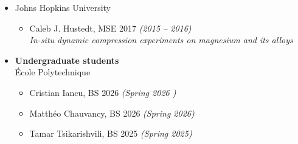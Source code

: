 \documentclass[a4paper,10pt, oneside]{article}
\begin{document}
\begin{itemize}[wide, labelwidth=!, labelindent=-1em]
\begin{itemize}[wide, labelwidth=!, labelindent=0em]
			\textit{(Master internship from the \'{E}cole Polytechnique, Paris, France) \\
				Rate-dependent polarization switching of ferroelectric materials}
			\item Leila Afilal, MS 2021  \hfill \textit{(March -- September 2021)} \\
			\textit{(Master thesis) Acoustic wave dispersion in architected metamaterials}
			\item Hannah Niese, MS 2021  \hfill \textit{(March -- July 2021)} \\
			\textit{(Semester project) Measuring transient waves in truss-based metamaterials}
			\item Roxanne Rais, MS 2021  \hfill \textit{(September 2020 -- February 2021)} \\
			\textit{(Semester project) Measuring acoustic wave propagation in architected metamaterials}
			\item Leila Afilal, MS 2021  \hfill \textit{(March -- December 2020)} \\
			\textit{(Semester project) An experiment to measure acoustic wave propagation in thin plates}
			\item Stephan Steiner, MS 2020  \hfill \textit{(2019 -- 2020)} \\
			\textit{(Master thesis) Experimental characterization of non-linear viscoelastic materials}
		\end{itemize} 
		\vspace*{0.5em}
		\item[]Johns Hopkins University
		\begin{itemize}[wide, labelwidth=!, labelindent=0em]
			\item Caleb J. Hustedt, MSE 2017 \hfill \textit{(2015 -- 2016)} \\
			\textit{In-situ dynamic compression experiments on magnesium and its alloys}
		\end{itemize}
		\vspace*{0.5em}
		\item[]\textbf{Undergraduate students} \\
		{\'E}cole Polytechnique
		\begin{itemize}[wide, labelwidth=!, labelindent=0em]
			\item Cristian Iancu, BS 2026 \hfill \textit{(Spring 2026 )}
			\item Matth{\'e}o Chauvancy, BS 2026 \hfill \textit{(Spring 2026)}
			\item Tamar Tsikarishvili, BS 2025 \hfill \textit{(Spring 2025)}

\end{itemize}
\end{itemize}
\end{document}
